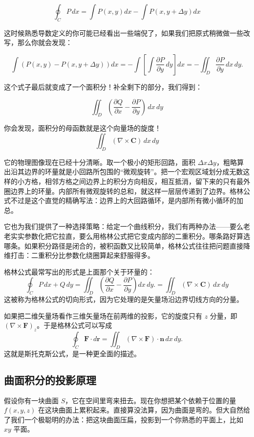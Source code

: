 \documentclass[UTF8]{ctexbook}
\begin{document}
\[
\oint_C P \, dx = \int P(x,y) dx - \int P(x,y+\Delta y) dx
\]

\bigskip

这时候熟悉导数定义的你可能已经看出一些端倪了，如果我们把原式稍微做一些改写，那么你就会发现：

\[
\int (P(x,y) - P(x,y+\Delta y) )dx = - \int \left[ \int \frac{\partial P}{\partial y} \, dy \right] dx= - \iint_D \frac{\partial P}{\partial y} \, dx\,dy.
\]

这个式子最后就变成了一个面积分！补全剩下的部分，我们得到：

\[
\iint_D (\frac{\partial Q}{\partial x}-\frac{\partial P}{\partial y}) \, dx\,dy 
\]

你会发现，面积分的母函数就是这个向量场的旋度！
\[
\iint_D (\nabla \times \mathbf{C}) \, dx\,dy 
\]

它的物理图像现在已经十分清晰。取一个极小的矩形回路，面积 $\Delta x \Delta y$，粗略算出沿其边界的环量就是小回路所包围的“微观旋转”。把一个宏观区域划分成无数这样的小方格，相邻方格之间边界上的积分方向相反，相互抵消，留下来的只有最外圈边界上的环量。内部所有微观旋转的总和，就这样一层层传递到了边界。格林公式不过是这个直觉的精确写法：边界上的大回路循环，是内部所有微小循环的加总。

它也为我们提供了一种选择策略：给定一个曲线积分，我们有两种办法——要么老老实实参数化把它拉直，要么用格林公式把它变成内部的二重积分。哪条路好算选哪条。如果积分路径是闭合的，被积函数又比较简单，格林公式往往把问题直接降维打击：二重积分比参数化绕圈算起来舒服得多。

格林公式最常写出的形式是上面那个关于环量的：
\[
\oint_C P \, dx + Q \, dy = \iint_D \left( \frac{\partial Q}{\partial x} - \frac{\partial P}{\partial y} \right) dx\,dy.=\iint_D (\nabla \times \mathbf{C}) \, dx\,dy 
\]
这被称为格林公式的切向形式，因为它处理的是矢量场沿边界切线方向的分量。

如果把二维矢量场看作三维矢量场在前两维的投影，它的旋度只有 $z$ 分量，即 $(\nabla \times \mathbf{F})_z$。于是格林公式可以写成
\[
\oint_C \mathbf{F} \cdot d\mathbf{r} = \iint_D (\nabla \times \mathbf{F}) \cdot \mathbf{n} \, dx\,dy.
\]
这就是斯托克斯公式，是一种更全面的描述。


\subsection{曲面积分的投影原理}

假设你有一块曲面 $S$，它在空间里弯来扭去。现在你想把某个依赖于位置的量 $f(x,y,z)$ 在这块曲面上累积起来。直接算没法算，因为曲面是弯的。但大自然给了我们一个极聪明的办法：把这块曲面压扁，投影到一个你熟悉的平面上，比如 $xy$ 平面。
\end{document}
